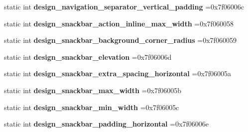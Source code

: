 \begin{DoxyCompactItemize}
static int {\bfseries design\+\_\+navigation\+\_\+separator\+\_\+vertical\+\_\+padding} =0x7f06006c
\item 
\mbox{\label{classandroid_1_1support_1_1v7_1_1cardview_1_1R_1_1dimen_ac4381bef49fb03af9b22ffaeabb85ad2}} 
static int {\bfseries design\+\_\+snackbar\+\_\+action\+\_\+inline\+\_\+max\+\_\+width} =0x7f060058
\item 
\mbox{\label{classandroid_1_1support_1_1v7_1_1cardview_1_1R_1_1dimen_afe008ffdc59a40f08b7c151329a07f8c}} 
static int {\bfseries design\+\_\+snackbar\+\_\+background\+\_\+corner\+\_\+radius} =0x7f060059
\item 
\mbox{\label{classandroid_1_1support_1_1v7_1_1cardview_1_1R_1_1dimen_a33afbe361d04cafae969e1bc2fae2d41}} 
static int {\bfseries design\+\_\+snackbar\+\_\+elevation} =0x7f06006d
\item 
\mbox{\label{classandroid_1_1support_1_1v7_1_1cardview_1_1R_1_1dimen_a82ce253b46418ac3bd4b0313c79071a8}} 
static int {\bfseries design\+\_\+snackbar\+\_\+extra\+\_\+spacing\+\_\+horizontal} =0x7f06005a
\item 
\mbox{\label{classandroid_1_1support_1_1v7_1_1cardview_1_1R_1_1dimen_add082b6de2cab053724a0d105f0007f7}} 
static int {\bfseries design\+\_\+snackbar\+\_\+max\+\_\+width} =0x7f06005b
\item 
\mbox{\label{classandroid_1_1support_1_1v7_1_1cardview_1_1R_1_1dimen_ab3c76303cabd59bb82c21120645ae481}} 
static int {\bfseries design\+\_\+snackbar\+\_\+min\+\_\+width} =0x7f06005c
\item 
\mbox{\label{classandroid_1_1support_1_1v7_1_1cardview_1_1R_1_1dimen_aee06856765e28b737335f449b08e45a3}} 
static int {\bfseries design\+\_\+snackbar\+\_\+padding\+\_\+horizontal} =0x7f06006e
\item 
\mbox{\label{classandroid_1_1support_1_1v7_1_1cardview_1_1R_1_1dimen_ade6eec5ec821db5721dbc0954c53c007}} 

\end{DoxyCompactItemize}
